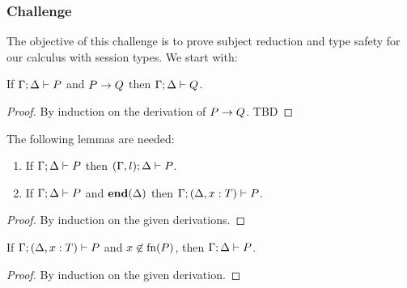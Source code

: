 \subsubsection{Challenge}
The objective of this challenge is to prove subject reduction and type safety for our calculus with session types. We start with:
\begin{theorem}
  If \( \Gamma;\Delta \vdash P \) and \( P \rightarrow Q \) then \( \Gamma;\Delta \vdash Q \).
\end{theorem}
\begin{proof}
  By induction on the derivation of $P \rightarrow Q$. TBD
\end{proof}

The following lemmas are needed:
\begin{lemma}[Weakening]\mbox{}
  \label{lemma:weak}
  \begin{enumerate}
  \item If \( \Gamma; \Delta \vdash P \) then
    \( (\Gamma, l);\Delta \vdash P \).
      \item If \( \Gamma; \Delta \vdash P \) and \( \mathbf{end}(\Delta) \) then
    \( \Gamma;(\Delta, x : T) \vdash P \).
\end{enumerate}
\end{lemma}
\begin{proof}
  By induction on the given derivations.
\end{proof}
\begin{lemma}[Strengthening]\mbox{}
  \label{lemma:strenD}
  If \( \Gamma; (\Delta, x : T) \vdash P \) and $x\not\in \textrm{fn}(P)$, then \( \Gamma; \Delta \vdash P \).
\end{lemma}
\begin{proof}
  By induction on the given derivation.
\end{proof}


